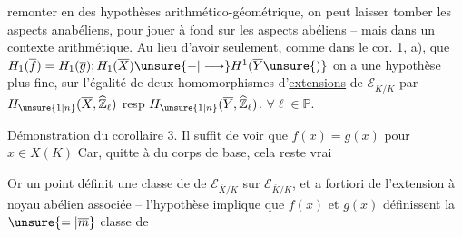 remonter en des hypothèses   arithmético-géométrique, on peut laisser tomber les aspects anabéliens, pour jouer à fond sur les aspects abéliens -- mais dans un contexte arithmétique. Au lieu d'avoir  seulement, comme dans le cor. 1, a),  que $H_1(\overline f)=H_1(\overline g);H_1(\overline X)\unsure{-|\longrightarrow}H^1(\overline Y\unsure{)}$ on a une hypothèse plus fine, sur l'égalité de deux homomorphismes d'\uline{extensions} de $\mathcal E_{\overline K/K}$ par $H_{\unsure{1|n}}(\overline X,\widehat{\mathbb Z}_\ell)$ resp $H_{\unsure{1|n}}(\overline Y,\widehat{\mathbb Z}_\ell)$. $\forall\ell\in\mathbb P$.

Démonstration du corollaire 3.
Il suffit de voir que $f(x)=g(x)$ pour  $x\in X(K)$ Car, quitte à   du corps de base, cela reste vrai   

Or un point définit une classe de    de $\mathcal E_{\overline X/K}$ sur $\mathcal E_{\overline K/K}$, et a fortiori de l'extension à noyau abélien associée -- l'hypothèse implique que $f(x)$ et $g(x)$ définissent la $\unsure{=|\overline m}$ classe de
